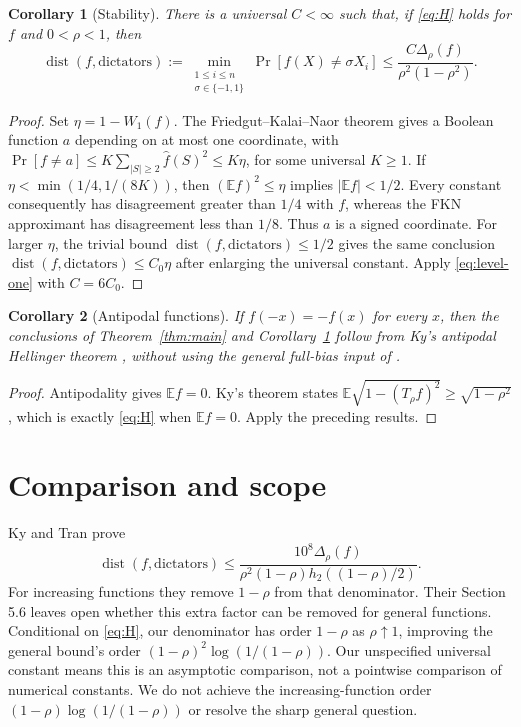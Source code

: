 \documentclass[11pt]{article}
\newtheorem{corollary}{Corollary}
\newcommand{\E}{\mathbb E}
\newcommand{\dist}{\operatorname{dist}}
\begin{document}
\begin{corollary}[Stability]\label{cor:stability}
There is a universal $C<\infty$ such that, if \eqref{eq:H} holds for
$f$ and $0<\rho<1$, then
\[
 \dist(f,\mathrm{dictators}):=
 \min_{\substack{1\le i\le n\\\sigma\in\{-1,1\}}}
 \Pr[f(X)\ne\sigma X_i]
 \le\frac{C\Delta_\rho(f)}{\rho^2(1-\rho^2)}.
\]
\end{corollary}
\begin{proof}
Set $\eta=1-W_1(f)$. The Friedgut--Kalai--Naor theorem \cite{FKN}
gives a Boolean function $a$ depending on at most one coordinate,
with $\Pr[f\ne a]\le K\sum_{|S|\ge2}\widehat f(S)^2\le K\eta$,
for some universal $K\ge1$.
If $\eta<\min(1/4,1/(8K))$, then $(\E f)^2\le\eta$ implies
$|\E f|<1/2$. Every constant consequently has disagreement greater
than $1/4$ with $f$, whereas the FKN approximant has disagreement less
than $1/8$. Thus $a$ is a signed coordinate.
For larger $\eta$, the trivial bound
$\dist(f,\mathrm{dictators})\le1/2$ gives the same conclusion
$\dist(f,\mathrm{dictators})\le C_0\eta$ after enlarging the universal
constant. Apply \eqref{eq:level-one} with $C=6C_0$.
\end{proof}

\begin{corollary}[Antipodal functions]\label{cor:antipodal}
If $f(-x)=-f(x)$ for every $x$, then the conclusions of
Theorem~\ref{thm:main} and Corollary~\ref{cor:stability} follow from
Ky's antipodal Hellinger theorem \cite[Theorem 1.1]{Ky}, without using
the general full-bias input of \cite{source}.
\end{corollary}
\begin{proof}
Antipodality gives $\E f=0$. Ky's theorem states
$\E\sqrt{1-(T_\rho f)^2}\ge\sqrt{1-\rho^2}$, which is exactly
\eqref{eq:H} when $\E f=0$. Apply the preceding results.
\end{proof}

\section{Comparison and scope}
Ky and Tran \cite[Theorem 1.1]{KT} prove
\[
 \dist(f,\mathrm{dictators})\le
 \frac{10^8\Delta_\rho(f)}{\rho^2(1-\rho)h_2((1-\rho)/2)}.
\]
For increasing functions they remove $1-\rho$ from that denominator.
Their Section 5.6 leaves open whether this extra factor can be removed
for general functions. Conditional on \eqref{eq:H}, our denominator
has order $1-\rho$ as $\rho\uparrow1$, improving the general bound's
order $(1-\rho)^2\log(1/(1-\rho))$. Our unspecified universal constant
means this is an asymptotic comparison, not a pointwise comparison of
numerical constants. We do not achieve the increasing-function
order $(1-\rho)\log(1/(1-\rho))$ or resolve the sharp general question.
\end{document}
